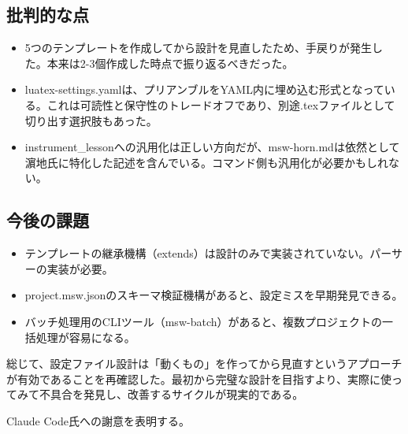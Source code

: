 \documentclass[a4paper,10pt,twocolumn]{ltjsarticle}
\begin{document}
\subsection{批判的な点}

\begin{itemize}[noitemsep]
    \item 5つのテンプレートを作成してから設計を見直したため、手戻りが発生した。本来は2-3個作成した時点で振り返るべきだった。
    \item luatex-settings.yamlは、プリアンブルをYAML内に埋め込む形式となっている。これは可読性と保守性のトレードオフであり、別途.texファイルとして切り出す選択肢もあった。
    \item instrument\_lessonへの汎用化は正しい方向だが、msw-horn.mdは依然として濵地氏に特化した記述を含んでいる。コマンド側も汎用化が必要かもしれない。
\end{itemize}

\subsection{今後の課題}

\begin{itemize}[noitemsep]
    \item テンプレートの継承機構（extends）は設計のみで実装されていない。パーサーの実装が必要。
    \item project.msw.jsonのスキーマ検証機構があると、設定ミスを早期発見できる。
    \item バッチ処理用のCLIツール（msw-batch）があると、複数プロジェクトの一括処理が容易になる。
\end{itemize}

総じて、設定ファイル設計は「動くもの」を作ってから見直すというアプローチが有効であることを再確認した。最初から完璧な設計を目指すより、実際に使ってみて不具合を発見し、改善するサイクルが現実的である。

\vspace{1\baselineskip}
\begin{flushright}
Claude Code氏への謝意を表明する。
\end{flushright}
\end{document}
